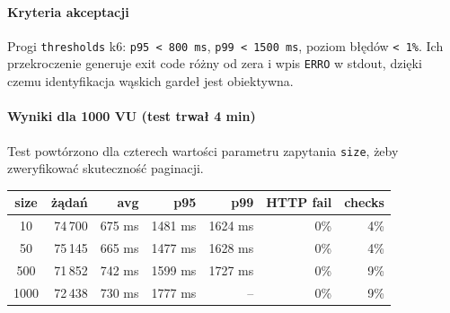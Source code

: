 \documentclass[12pt,a4paper]{article}
\begin{document}
\paragraph{Kryteria akceptacji}
Progi \texttt{thresholds} k6: \texttt{p95~<~800~ms}, \texttt{p99~<~1500~ms},
poziom błędów \texttt{<~1\%}. Ich przekroczenie generuje exit code różny od zera
i wpis \texttt{ERRO} w stdout, dzięki czemu identyfikacja wąskich gardeł jest
obiektywna.

\paragraph{Wyniki dla 1000 VU (test trwał 4 min)}
Test powtórzono dla czterech wartości parametru zapytania \texttt{size},
żeby zweryfikować skuteczność paginacji.

\begin{center}
\begin{tabular}{c r r r r r r}
  \toprule
  \textbf{size} & \textbf{żądań} & \textbf{avg} & \textbf{p95} & \textbf{p99} & \textbf{HTTP fail} & \textbf{checks} \\
  \midrule
  10   & 74\,700 & 675 ms & 1481 ms & 1624 ms & 0\% & 4\% \\
  50   & 75\,145 & 665 ms & 1477 ms & 1628 ms & 0\% & 4\% \\
  500  & 71\,852 & 742 ms & 1599 ms & 1727 ms & 0\% & 9\% \\
  1000 & 72\,438 & 730 ms & 1777 ms & --      & 0\% & 9\% \\
  \bottomrule
\end{tabular}
\end{center}
\end{document}
